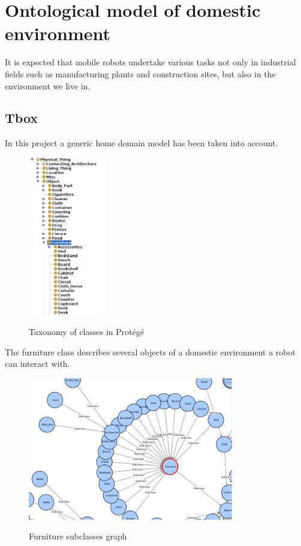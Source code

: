 \section{Ontological model of domestic environment}
It is expected that mobile robots undertake various tasks not only in industrial fields such as manufacturing plants and construction sites, but also in the environment we live in.

\subsection{Tbox}
In this project a generic home domain model has been taken into account. 

\begin{figure}[H]
\centering
\includegraphics[width=0.3\textwidth]{imgs/ontology.png}
\label{fig:ontologyThings}
\caption{Taxonomy of classes in Prot\'eg\'e}
\end{figure}

The furniture class describes several objects of a domestic environment a robot can interact with.

\begin{figure}[H]
\centering
\includegraphics[width=0.8\textwidth]{imgs/ontology1.png}
\label{fig:furniture}
\caption{Furniture subclasses graph}
\end{figure}


